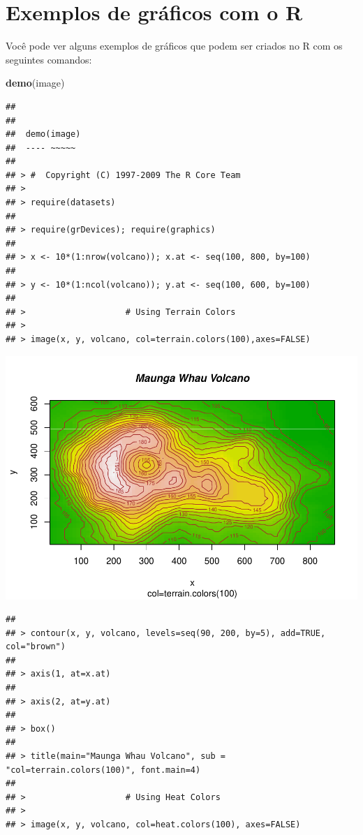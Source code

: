 \documentclass[]{book}
\newenvironment{Shaded}{\begin{snugshade}}{\end{snugshade}}
\newcommand{\KeywordTok}[1]{\textcolor[rgb]{0.13,0.29,0.53}{\textbf{#1}}}
\newcommand{\NormalTok}[1]{#1}
\begin{document}
\hypertarget{exemplos-de-graficos-com-o-r}{%
\section{Exemplos de gráficos com o R}\label{exemplos-de-graficos-com-o-r}}

Você pode ver alguns exemplos de gráficos que podem ser criados no R com os seguintes comandos:

\begin{Shaded}
\begin{Highlighting}[]
\KeywordTok{demo}\NormalTok{(image)}
\end{Highlighting}
\end{Shaded}

\begin{verbatim}
## 
## 
##  demo(image)
##  ---- ~~~~~
## 
## > #  Copyright (C) 1997-2009 The R Core Team
## > 
## > require(datasets)
## 
## > require(grDevices); require(graphics)
## 
## > x <- 10*(1:nrow(volcano)); x.at <- seq(100, 800, by=100)
## 
## > y <- 10*(1:ncol(volcano)); y.at <- seq(100, 600, by=100)
## 
## >                    # Using Terrain Colors
## > 
## > image(x, y, volcano, col=terrain.colors(100),axes=FALSE)
\end{verbatim}

\includegraphics{TudodoR_files/figure-latex/unnamed-chunk-145-1.pdf}

\begin{verbatim}
## 
## > contour(x, y, volcano, levels=seq(90, 200, by=5), add=TRUE, col="brown")
## 
## > axis(1, at=x.at)
## 
## > axis(2, at=y.at)
## 
## > box()
## 
## > title(main="Maunga Whau Volcano", sub = "col=terrain.colors(100)", font.main=4)
## 
## >                    # Using Heat Colors
## > 
## > image(x, y, volcano, col=heat.colors(100), axes=FALSE)
\end{verbatim}
\end{document}

